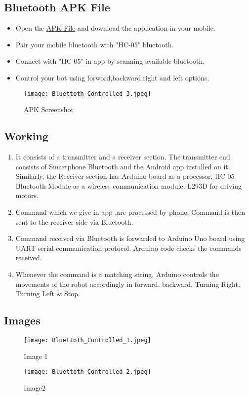 \documentclass[journal,12pt,twocolumn]{IEEEtran}
\begin{document}
\subsection{\textbf{Bluetooth APK File}}
\begin{itemize}
    \item Open the \href{https://github.com/ka-raja-babu/Arduino-Based-Robot/blob/main/Bluetooth%20Controlled%20Robot/APK%20File.apk}{APK File} and download the application in your mobile.
    \item Pair your mobile bluetooth with "HC-05" bluetooth.
    \item Connect with "HC-05" in app by scanning available bluetooth.
    \item Control your bot using forword,backward,right and left options.
\end{itemize}

\begin{figure}[!ht]
\centering
\texttt{[image: Bluettoth\_Controlled\_3.jpeg]}
\caption{APK Screenshot}
\end{figure}

\subsection{\textbf{Working}}
\begin{enumerate}
    \item It consists of a transmitter and a receiver section. The transmitter end consists of Smartphone Bluetooth and the Android app installed on it. Similarly, the Receiver section has Arduino board as a processor, HC-05 Bluetooth Module as a wireless communication module, L293D for driving motors.
    \item Command which we give in app ,are processed by phone. Command is then sent to the receiver side via Bluetooth.
    \item Command received via Bluetooth is forwarded to Arduino Uno board using UART serial communication protocol. Arduino code checks the commands received. 
    \item Whenever the command is a matching string, Arduino controls the movements of the robot accordingly in forward, backward, Turning Right, Turning Left & Stop.
\end{enumerate}

\subsection{\textbf{Images}}

\begin{figure}[!ht]
\centering
\texttt{[image: Bluettoth\_Controlled\_1.jpeg]}
\caption{Image 1}
\end{figure}

\begin{figure}[!ht]
\centering
\texttt{[image: Bluettoth\_Controlled\_2.jpeg]}
\caption{Image2}
\end{figure}
\end{document}
